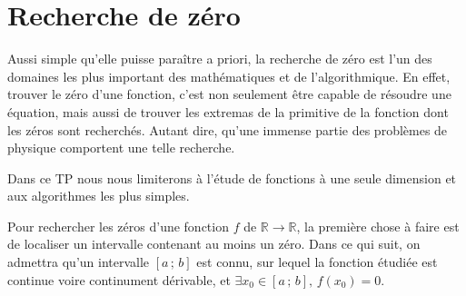 \section{Recherche de zéro}
Aussi simple qu'elle puisse paraître a priori, la recherche de zéro est
l'un des domaines les plus important des mathématiques et de l'algorithmique. 
En effet, trouver le zéro d'une fonction, c'est non seulement 
être capable de résoudre une équation, mais aussi de trouver 
les extremas de la primitive de la fonction dont les zéros sont recherchés. 
Autant dire, qu'une immense partie des problèmes de physique comportent 
une telle recherche.

Dans ce TP nous nous limiterons à l'étude de fonctions à une seule dimension et aux algorithmes les plus simples. 

Pour rechercher les zéros d'une 
fonction $f$ de $\mathbb{R}  \longrightarrow  \mathbb{R}$, 
la première chose à faire est  de localiser un intervalle contenant 
au moins un zéro. Dans ce qui suit, on admettra qu'un intervalle $[a\,;\,b]$
est connu, sur lequel la fonction étudiée est continue voire continument dérivable, et $\exists x_0 \in  [a\,;\,b], \, f(x_0)=0$.

